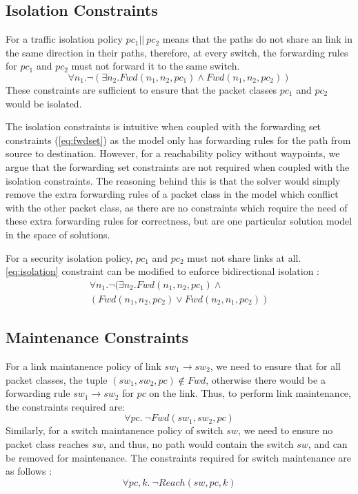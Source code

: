 \documentclass[]{sig}
\begin{document}
\subsection{Isolation Constraints}
For a traffic isolation policy $pc_1 || \ pc_2$ means that the paths do not share an link in the same direction in their paths, therefore, at every switch, the forwarding rules for $pc_1$ and $pc_2$ must not forward it to the same switch.  
\begin{equation}
	\forall n_1. \neg ( \exists n_2. Fwd(n_1,n_2,pc_1) \wedge Fwd(n_1,n_2,pc_2)) \label{eq:isolation}
\end{equation}
These constraints are sufficient to ensure that the packet classes $pc_1$ and $pc_2$ would be isolated. 

The isolation constraints is intuitive when coupled with the forwarding set constraints (\cref{eq:fwdset}) as the model only has forwarding rules for the path from source to destination. However, for a reachability policy without waypoints, we argue that the forwarding set constraints are not required when coupled with the isolation constraints. The reasoning behind this is that the solver would simply remove the extra forwarding rules of a packet class in the model which conflict with the other packet class, as there are no constraints which require the need of these extra forwarding rules for correctness, but are one particular solution model in the space of solutions. 

For a security isolation policy, $pc_1$ and $pc_2$ must not share links at all. \cref{eq:isolation} constraint can be modified to enforce bidirectional isolation :
\begin{multline}
\forall n_1. \neg ( \exists n_2. Fwd(n_1,n_2,pc_1) \wedge \\ (Fwd(n_1,n_2,pc_2) \vee Fwd(n_2,n_1,pc_2)) \label{eq:secisolation}
\end{multline}

\subsection{Maintenance Constraints}
For a link maintanence policy of link $sw_1 \rightarrow sw_2$, we need to ensure that for all packet classes, the tuple $(sw_1, sw_2, pc) \notin Fwd$, otherwise there would be a forwarding rule $sw_1 \rightarrow sw_2$ for $pc$ on the link. Thus, to perform link maintenance, the constraints required are: 
\begin{equation}
	\forall pc. \ \neg Fwd(sw_1, sw_2, pc)
\end{equation}
Similarly, for a switch maintanence policy of switch $sw$, we need to ensure no packet class reaches $sw$, and thus, no path would contain the switch $sw$, and can be removed for maintenance. The constraints required for switch maintenance are as follows : 
\begin{equation}
	\forall pc, k. \ \neg Reach(sw, pc, k)  
\end{equation}
\end{document}

